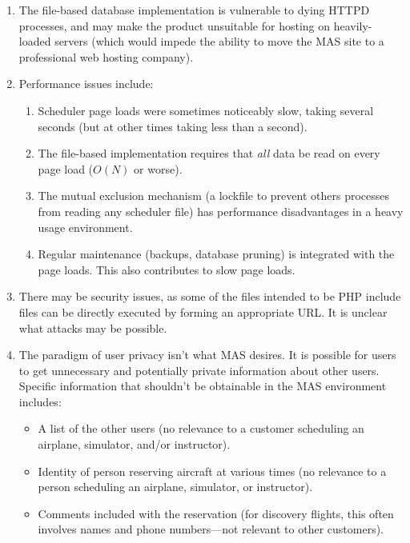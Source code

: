 \documentclass[letterpaper,10pt,titlepage]{article}
\begin{document}
\begin{enumerate}
\item The file-based database implementation is vulnerable to
      dying HTTPD processes, and may make the product unsuitable for
      hosting on heavily-loaded servers (which would impede the ability
      to move the MAS site to a professional web hosting company).
\item Performance issues include:
      \begin{enumerate}
      \item Scheduler page loads were sometimes noticeably slow,
            taking several seconds (but at other times taking less
            than a second).
      \item The file-based implementation requires that \emph{all}
            data be read on every page load ($O(N)$ or worse).
      \item The mutual exclusion mechanism (a lockfile to prevent
            others processes from reading any scheduler file)
            has performance disadvantages in a heavy usage environment.
      \item Regular maintenance (backups, database pruning)
            is integrated with the page loads.  This also
            contributes to slow page loads.
      \end{enumerate}
\item There may be security issues, as some of the files intended to be
      PHP include files can be directly executed by forming an appropriate
      URL\@.  It is unclear what attacks may be possible.
\item The paradigm of user privacy isn't what MAS desires.  It is
      possible for users to get unnecessary and potentially private
      information about other users.  Specific information that shouldn't be
      obtainable in the MAS environment includes:
      \begin{itemize}
      \item A list of the other users (no relevance to a customer
            scheduling an airplane, simulator, and/or instructor).
      \item Identity of person reserving aircraft at various times (no relevance
            to a person scheduling an airplane, simulator, or instructor).
      \item Comments included with the reservation (for discovery flights, this often involves
            names and phone numbers---not relevant to other customers).
      \end{itemize}

\end{enumerate}
\end{document}
